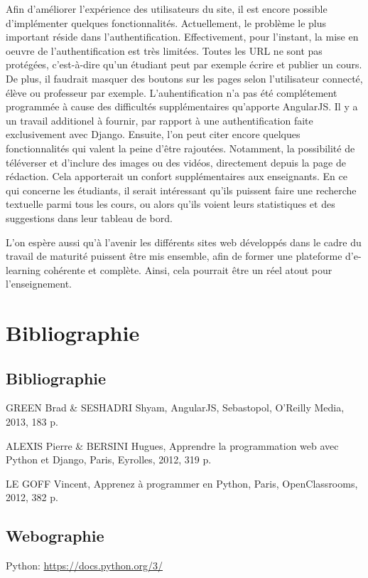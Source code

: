\documentclass[a4paper,10pt,twoside]{sphinxmanual}
\begin{document}
Afin d'améliorer l'expérience des utilisateurs du site, il est encore possible d'implémenter quelques fonctionnalités. Actuellement, le problème le plus important réside dans l'authentification. Effectivement, pour l'instant, la mise en oeuvre de l'authentification est très limitées. Toutes les URL ne sont pas protégées, c'est-à-dire qu'un étudiant peut par exemple écrire et publier un cours. De plus, il faudrait masquer des boutons sur les pages selon l'utilisateur connecté, élève ou professeur par exemple. L'auhentification n'a pas été complétement programmée à cause des difficultés supplémentaires qu'apporte AngularJS. Il y a un travail additionel à fournir, par rapport à une authentification faite exclusivement avec Django. Ensuite, l'on peut citer encore quelques fonctionnalités qui valent la peine d'être rajoutées. Notamment, la possibilité de téléverser et d'inclure des images ou des vidéos, directement depuis la page de rédaction. Cela apporterait un confort supplémentaires aux enseignants. En ce qui concerne les étudiants, il serait intéressant qu'ils puissent faire une recherche textuelle parmi tous les cours, ou alors qu'ils voient leurs statistiques et des suggestions dans leur tableau de bord.

L'on espère aussi qu'à l'avenir les différents sites web développés dans le cadre du travail de maturité puissent être mis ensemble, afin de former une plateforme d'e-learning cohérente et complète. Ainsi, cela pourrait être un réel atout pour l'enseignement.


\chapter{Bibliographie}
\label{bibliographie:bibliographie}\label{bibliographie::doc}

\section{Bibliographie}
\label{bibliographie:id1}
GREEN Brad \& SESHADRI Shyam, AngularJS, Sebastopol, O’Reilly Media, 2013, 183 p.

ALEXIS Pierre \& BERSINI Hugues, Apprendre la programmation web avec Python et Django, Paris, Eyrolles, 2012, 319 p.

LE GOFF Vincent, Apprenez à programmer en Python, Paris, OpenClassrooms, 2012, 382 p.


\section{Webographie}
\label{bibliographie:webographie}
Python: \href{https://docs.python.org/3/}{https://docs.python.org/3/}
\end{document}
